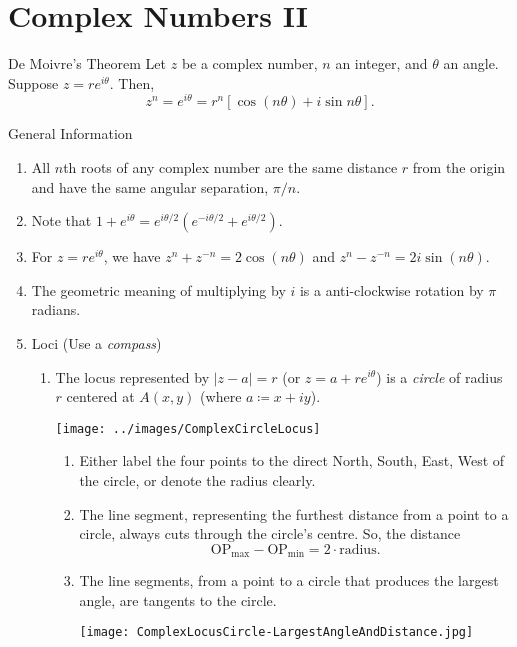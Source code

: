 \documentclass[oneside]{book}
\begin{document}
\section{Complex Numbers II}
\begin{theorem}{De Moivre's Theorem}{}
  Let \(z\) be a complex number, \(n\) an integer, and \(\theta\) an angle. Suppose \(z=re^{i\theta}\). Then, 
  \[z^n=e^{i\theta}=r^n[\cos(n\theta)+i\sin{n\theta}].\]
\end{theorem}
\begin{stbox}{General Information}
  \begin{enumerate}
    \item All \(n\)th roots of any complex number are the same distance \(r\) from the origin and have the same angular separation, \(\pi/n\).
    \item Note that \(1+e^{i\theta}=e^{i\theta/2}(e^{-i\theta/2}+e^{i\theta/2})\).
    \item For \(z=re^{i\theta}\), we have \(z^n+z^{-n}=2\cos(n\theta)\) and \(z^n-z^{-n}=2i\sin(n\theta)\).
    \item The geometric meaning of multiplying by \(i\) is a anti-clockwise rotation by \(\pi\) radians.
    \item Loci (Use a \emph{compass})
    \begin{enumerate}
      \item The locus represented by \(\lvert z-a \rvert =r\) (or \(z=a+re^{i\theta}\)) is a \emph{circle} of radius \(r\) centered at \(A(x,y)\) (where \(a\coloneq x+iy\)).
      \begin{center}
        \texttt{[image: ../images/ComplexCircleLocus]}
      \end{center}
      \begin{enumerate}
        \item Either label the four points to the direct North, South, East, West of the circle, or denote the radius clearly. 
        \item The line segment, representing the furthest distance from a point to a circle, always cuts through the circle's centre. So, the distance
        \[\text{OP}_{\text{max}}-\text{OP}_{\text{min}}=2\cdot\text{radius}.\]
        \item The line segments, from a point to a circle that produces the largest angle, are tangents to the circle.
        \begin{center}
          \texttt{[image: ComplexLocusCircle-LargestAngleAndDistance.jpg]}

\end{center}
\end{enumerate}
\end{enumerate}
\end{enumerate}
\end{stbox}
\end{document}
